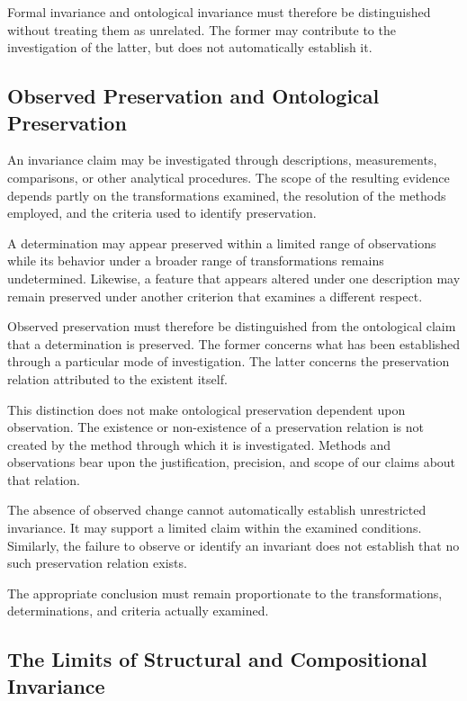 Formal invariance and ontological invariance must
therefore be distinguished without treating them
as unrelated. The former may contribute to the
investigation of the latter, but does not automatically
establish it.

\subsection{Observed Preservation and Ontological Preservation}

An invariance claim may be investigated through
descriptions, measurements, comparisons, or other
analytical procedures. The scope of the resulting
evidence depends partly on the transformations examined,
the resolution of the methods employed, and the criteria
used to identify preservation.

A determination may appear preserved within a limited
range of observations while its behavior under a broader
range of transformations remains undetermined. Likewise,
a feature that appears altered under one description
may remain preserved under another criterion that
examines a different respect.

Observed preservation must therefore be distinguished
from the ontological claim that a determination is
preserved. The former concerns what has been established
through a particular mode of investigation. The latter
concerns the preservation relation attributed to the
existent itself.

This distinction does not make ontological preservation
dependent upon observation. The existence or non-existence
of a preservation relation is not created by the method
through which it is investigated. Methods and observations
bear upon the justification, precision, and scope of
our claims about that relation.

The absence of observed change cannot automatically
establish unrestricted invariance. It may support a
limited claim within the examined conditions. Similarly,
the failure to observe or identify an invariant does
not establish that no such preservation relation exists.

The appropriate conclusion must remain proportionate
to the transformations, determinations, and criteria
actually examined.

\subsection{The Limits of Structural and Compositional Invariance}

